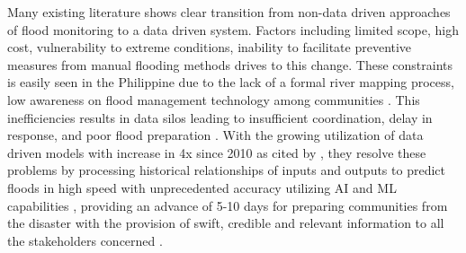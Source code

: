 \documentclass{research}
\begin{document}
Many existing literature shows clear transition from non-data driven approaches of flood monitoring to a data driven system. Factors including 
limited scope, high cost, vulnerability to extreme conditions, inability to facilitate preventive measures from manual flooding methods 
\cite{bukhari2025review}\cite{Won_Lee_Moon_Moon_2022} \cite{KHOSHKONESH2024175859}\cite{Pahuriray_Cerna_2025}\cite{idoghor2026remote}
\cite{Sengupta_2024}\cite{Ikechukwu_Idigo_Nnebe_Ozue_Agwunobi_2024}\cite{tolentino2022real}\cite{Attobrah_Ohaka_Ifionu_Njemanze_Okonkwo_2026}
\cite{Khan2025}\cite{w15010178} drives to this change. These constraints is easily seen in the Philippine due to the lack of a formal river 
mapping process, low awareness on flood management technology among communities \cite{Crucillo_Lucero_Gelito_Medina_Palconit_2026}
\cite{demesa2025gis}. This inefficiencies results in data silos leading to insufficient coordination, delay in response, and poor flood 
preparation \cite{Mukherjee2024}\cite{rs17173104}. With the growing utilization of data driven models with increase in 4x since 2010 as cited 
by \cite{davary2026}, they resolve these problems by processing historical relationships of inputs and outputs to predict floods in high speed 
with unprecedented accuracy utilizing AI and ML capabilities \cite{GAO2024132228}\cite{anik2025evolution}\cite{Rashid_Abidin_Abas_2024}
\cite{Wang_Wu_Yichen_2025}, providing an advance of 5-10 days for preparing communities from the disaster \cite{palash2024datadriven}
\cite{w14142221}\cite{Mirro2025}\cite{kuhaneswaran2025evolution} with the provision of swift, credible and relevant information to all the 
stakeholders concerned \cite{Hammood_Hammood_Aliesawi_Osiobe_Hasan_Malallah_Abbas_2024}\cite{koutsovili2023early}
\cite{samansiri2023characteristics}\cite{H_Warni_Angriawan_Hariadi_Arif_Maulina_2024}\cite{11209450}.
\end{document}
